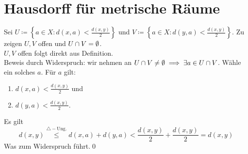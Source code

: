 \documentclass[sectionformat=aufgabe]{gadsescript}
\begin{document}
\section{Hausdorff für metrische Räume}
Sei $ U \coloneqq \left\{ a \in X : d(x, a) < \frac{ d(x, y) }{ 2 } \right\} $ und $ V \coloneqq \left\{ a \in X : d(y, a) < \frac{ d(x, y) }{ 2 }  \right\}  $.
Zu zeigen $ U, V $ offen und $ U \cap V = \emptyset  $.\\
$ U, V $ offen folgt direkt aus Definition.\\
Beweis durch Widerspruch: wir nehmen an $ U \cap V \neq \emptyset \implies \exists a \in U \cap V $. Wähle ein solches $ a $. Für $ a $ gilt:
\begin{enumerate}[label=(\roman*)]
	\item $ d(x, a) < \frac{ d(x, y) }{ 2 }  $ und
	\item $ d(y, a) < \frac{ d(x, y) }{ 2 }  $.
\end{enumerate}
Es gilt
\[
	d(x, y) \overset{\triangle-\text{Ung.} }{\leq } d(x, a) + d(y, a) < \frac{ d(x, y) }{ 2 } + \frac{ d(x, y) }{ 2 } = d(x, y)
\]
Was zum Widerspruch führt.\qed
\end{document}

